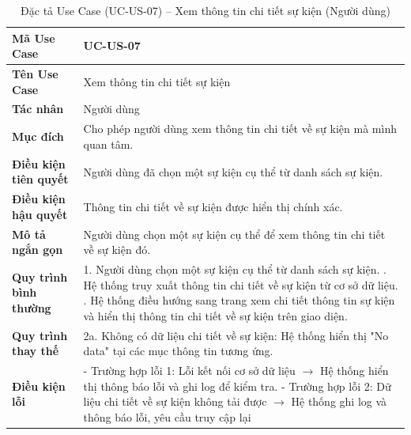 \renewcommand{\arraystretch}{1.3}
\setlength{\tabcolsep}{4pt}
\begin{longtable}{|p{}|p{}|}
\caption{Đặc tả Use Case (UC-US-07) -- Xem thông tin chi tiết sự kiện (Người dùng) }\label{tab:uc_view_event_details}\\
\hline
\textbf{Mã Use Case} & UC-US-07 \\ \hline
\textbf{Tên Use Case} & Xem thông tin chi tiết sự kiện \\ \hline
\textbf{Tác nhân} & Người dùng \\ \hline
\textbf{Mục đích} & Cho phép người dùng xem thông tin chi tiết về sự kiện mà mình quan tâm. \\ \hline
\textbf{Điều kiện tiên quyết} & Người dùng đã chọn một sự kiện cụ thể từ danh sách sự kiện. \\ \hline
\textbf{Điều kiện hậu quyết} & Thông tin chi tiết về sự kiện được hiển thị chính xác. \\ \hline
\textbf{Mô tả ngắn gọn} & Người dùng chọn một sự kiện cụ thể để xem thông tin chi tiết về sự kiện đó. \\ \hline
\textbf{Quy trình bình thường} &
1. Người dùng chọn một sự kiện cụ thể từ danh sách sự kiện. \newline
2. Hệ thống truy xuất thông tin chi tiết về sự kiện từ cơ sở dữ liệu. \newline
3. Hệ thống điều hướng sang trang xem chi tiết thông tin sự kiện và hiển thị thông tin chi tiết về sự kiện trên giao diện. \\ \hline
\textbf{Quy trình thay thế} &
2a. Không có dữ liệu chi tiết về sự kiện: Hệ thống hiển thị "No data" tại các mục thông tin tương ứng. \\ \hline
\textbf{Điều kiện lỗi} &
- Trường hợp lỗi 1: Lỗi kết nối cơ sở dữ liệu $\rightarrow$ Hệ thống hiển thị thông báo lỗi và ghi log để kiểm tra. \newline
- Trường hợp lỗi 2: Dữ liệu chi tiết về sự kiện không tải được $\rightarrow$ Hệ thống ghi log và thông báo lỗi, yêu cầu truy cập lại \\ \hline
\end{longtable}

